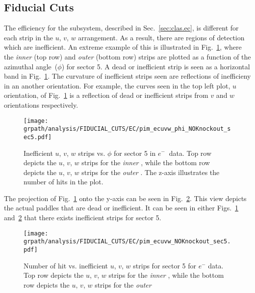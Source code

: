 \subsection{ Fiducial Cuts}\label{sec:analysis.eccc_fid}

The efficiency for the  subsystem, described in Sec.~\ref{sec:clas.ec}, is different for each strip in the $u$, $v$, $w$ arrangement. As a result, there are regions of detection which are inefficient. An extreme example of this is illustrated in Fig.~\ref{fig:neg:ec.sec5}, where the  \emph{inner} (top row) and \emph{outer} (bottom row) strips are plotted as a function of the azimuthal angle~($\phi$) for sector 5. A dead or inefficient strip is seen as a horizontal band in Fig.~\ref{fig:neg:ec.sec5}.  The curvature of inefficient strips seen are reflections of inefficieny in an another orientation. For example, the curves seen in the top left plot, $u$ orientation, of Fig.~\ref{fig:neg:ec.sec5} is a reflection of dead or inefficient strips from $v$ and $w$ orientations respectively.
%
\begin{figure}[h!]\begin{center}
\texttt{[image: \\grpath/analysis/FIDUCIAL\_CUTS/EC/pim\_ecuvw\_phi\_NOKnockout\_sec5.pdf]}
\caption[Inefficient  $u$, $v$, $w$ strips vs. $\phi$ for sector 5 in  $e^{-} \ $ data]{\label{fig:neg:ec.sec5}Inefficient  $u$, $v$, $w$ strips vs. $\phi$ for sector 5 in  $e^{-} \ $ data. Top row depicts the $u$, $v$, $w$ strips for the \emph{inner} , while the bottom row depicts the $u$, $v$, $w$ strips for the \emph{outer} . The z-axis illustrates the number of hits in the plot.}
\end{center}\end{figure}
%
The projection of Fig.~\ref{fig:neg:ec.sec5} onto the y-axis can be seen in Fig.~\ref{fig:neg.ecstrip.sec5}. This view depicts the actual paddles that are dead or inefficient. It can be seen in either Figs.~\ref{fig:neg:ec.sec5} and~\ref{fig:neg.ecstrip.sec5} that there exists inefficient  strips for sector 5. 
\begin{figure}[h!]\begin{center}
\texttt{[image: \\grpath/analysis/FIDUCIAL\_CUTS/EC/pim\_ecuvw\_NOKnockout\_sec5.pdf]}
\caption[Number of hit vs. inefficient  $u$, $v$, $w$ strips for sector 5 for $e^-$ data]{\label{fig:neg.ecstrip.sec5} Number of hit vs. inefficient  $u$, $v$, $w$ strips for sector 5 for $e^-$ data. Top row depicts the $u$, $v$, $w$  strips for the \emph{inner} , while the bottom row depicts the $u$, $v$, $w$  strips for the \emph{outer} }
\end{center}\end{figure}
